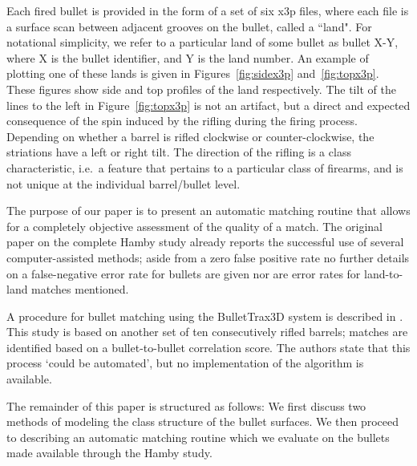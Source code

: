 \documentclass[aoas, preprint]{imsart}\usepackage[]{graphicx}\usepackage[]{color}
\begin{document}
Each fired bullet is provided in the form of a set of six x3p files, where each file is a surface scan between adjacent grooves on the bullet, called a ``land". For notational simplicity, we refer to a particular land of some bullet as bullet X-Y, where X is the bullet identifier, and Y is the land number. An example of plotting one of these lands is given in Figures~\ref{fig:sidex3p} and~\ref{fig:topx3p}. These figures show side and top profiles of the land respectively. The tilt of the lines to the left in Figure~\ref{fig:topx3p} is not an artifact, but a direct and expected consequence of the spin induced by the rifling during the firing process. Depending on whether a barrel is rifled clockwise or counter-clockwise, the striations have a left or right tilt. The direction of the rifling is a class characteristic, i.e.\ a feature that pertains to a particular class of firearms, and is not unique at the individual barrel/bullet level.

The purpose of our paper is to present an automatic matching routine that allows for a completely objective assessment of the quality of a match. 
The original paper on the complete Hamby study already reports the successful use of several computer-assisted methods; aside from a zero false positive rate no further details on a false-negative error rate for bullets are given nor are error rates for land-to-land matches mentioned. 
 
A procedure for bullet matching using the BulletTrax3D system is described in \citet{roberge:2006}. This study is based on another set of ten consecutively rifled barrels; matches are identified based on a bullet-to-bullet correlation score. The authors state that this process `could be automated', but no implementation of the algorithm is available. 

The remainder of this paper is structured as follows: We first discuss two methods of modeling the class structure of the bullet surfaces. %
We then proceed to describing an automatic matching routine which we evaluate on the bullets made available through the Hamby study.
\end{document}
